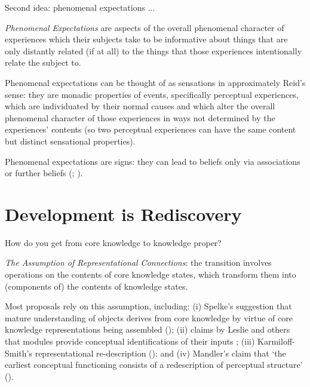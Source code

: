 \documentclass[12pt]{extarticle}
\begin{document}
\begin{multicols}{3}
Second idea: phenomenal expectations ...

\emph{Phenomenal Expectations}
are aspects of the overall phenomenal character of experiences which their subjects take to be
informative about things that are only distantly related (if at all) to the things that those
experiences intentionally relate the subject to.

Phenomenal expectations can be thought of as sensations in approximately Reid’s sense: they are
monadic properties of events, specifically perceptual experiences, which are individuated by their
normal causes
and which alter the overall phenomenal character of those experiences in ways not determined by the
experiences’ contents
(so two perceptual experiences can have the same content but distinct sensational properties).

Phenomenal expectations are signs:
they can lead to beliefs only via associations or further beliefs
(\citealp[Essay~II, Chap.~16, p.~228]{Reid:1785cj};
\citealp[Chap.~VI sect.~III, pp.~164–5]{Reid:1785nz}).

\section{Development is Rediscovery}
How do you get from core knowledge to knowledge proper?

\emph{The Assumption of Representational Connections}: the transition involves operations on the contents of core knowledge states, which transform them into (components of) the contents of knowledge states.

Most proposals rely on this assumption, including:
(i) Spelke’s suggestion that mature understanding of objects derives from core knowledge by virtue of core knowledge representations being assembled (\citeyear{Spelke:2000nf}); (ii) claims by Leslie and others that modules provide conceptual identifications of their inputs \citep{Leslie:1988ct}; (iii) Karmiloff-Smith’s representational re-description (\citeyear{Karmiloff-Smith:1992lv}); and (iv) Mandler’s claim that ‘the earliest conceptual functioning consists of a redescription of perceptual structure’ (\citeyear{Mandler:1992vn}).


\end{multicols}
\end{document}
